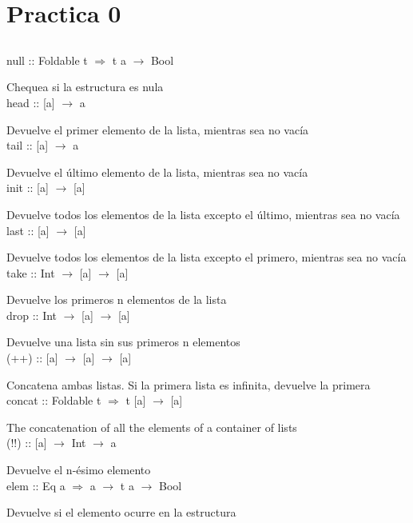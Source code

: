 \section{Practica 0}

\subsection{}
null :: Foldable t $\Rightarrow$ t a $\rightarrow$ Bool

Chequea si la estructura es nula \\

head :: [a] $\rightarrow$ a

Devuelve el primer elemento de la lista, mientras sea no vacía \\

tail :: [a] $\rightarrow$ a

Devuelve el último elemento de la lista, mientras sea no vacía \\

init :: [a] $\rightarrow$ [a]

Devuelve todos los elementos de la lista excepto el último, mientras sea no vacía \\

last :: [a] $\rightarrow$ [a]

Devuelve todos los elementos de la lista excepto el primero, mientras sea no vacía \\

take :: Int $\rightarrow$ [a] $\rightarrow$ [a]

Devuelve los primeros n elementos de la lista \\

drop :: Int $\rightarrow$ [a] $\rightarrow$ [a]

Devuelve una lista sin sus primeros n elementos \\

(++) :: [a] $\rightarrow$ [a] $\rightarrow$ [a]

Concatena ambas listas. Si la primera lista es infinita, devuelve la primera \\

concat :: Foldable t $\Rightarrow$ t [a] $\rightarrow$ [a]

The concatenation of all the elements of a container of lists \\

(!!) :: [a] $\rightarrow$ Int $\rightarrow$ a

Devuelve el n-ésimo elemento \\

elem :: Eq a $\Rightarrow$ a $\rightarrow$ t a $\rightarrow$ Bool

Devuelve si el elemento ocurre en la estructura